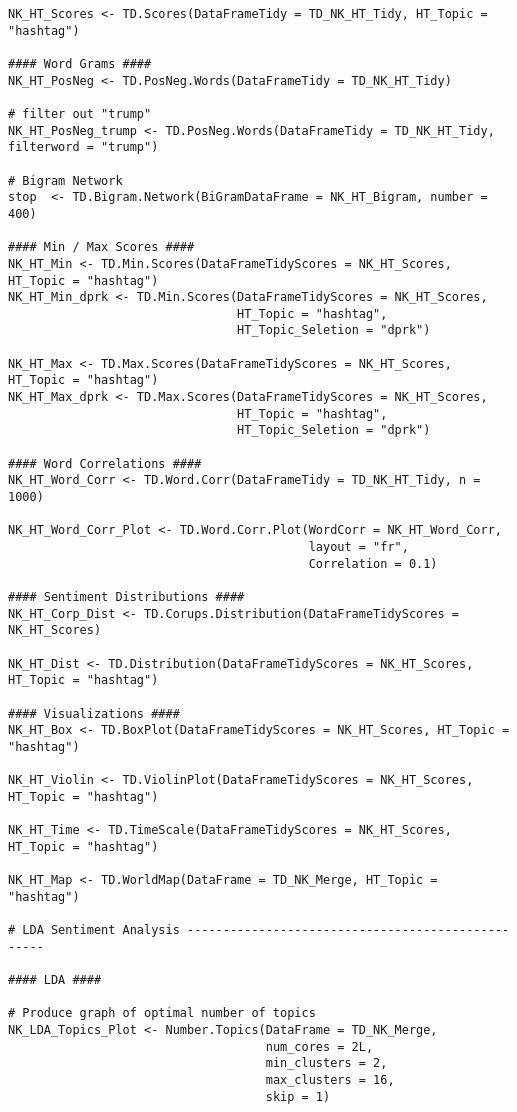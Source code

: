 \begin{lstlisting}
NK_HT_Scores <- TD.Scores(DataFrameTidy = TD_NK_HT_Tidy, HT_Topic = "hashtag")

#### Word Grams #### 
NK_HT_PosNeg <- TD.PosNeg.Words(DataFrameTidy = TD_NK_HT_Tidy)

# filter out "trump"
NK_HT_PosNeg_trump <- TD.PosNeg.Words(DataFrameTidy = TD_NK_HT_Tidy, filterword = "trump")

# Bigram Network
stop  <- TD.Bigram.Network(BiGramDataFrame = NK_HT_Bigram, number = 400)

#### Min / Max Scores #### 
NK_HT_Min <- TD.Min.Scores(DataFrameTidyScores = NK_HT_Scores, HT_Topic = "hashtag")
NK_HT_Min_dprk <- TD.Min.Scores(DataFrameTidyScores = NK_HT_Scores, 
                                HT_Topic = "hashtag", 
                                HT_Topic_Seletion = "dprk")

NK_HT_Max <- TD.Max.Scores(DataFrameTidyScores = NK_HT_Scores, HT_Topic = "hashtag")
NK_HT_Max_dprk <- TD.Max.Scores(DataFrameTidyScores = NK_HT_Scores, 
                                HT_Topic = "hashtag", 
                                HT_Topic_Seletion = "dprk")

#### Word Correlations ####
NK_HT_Word_Corr <- TD.Word.Corr(DataFrameTidy = TD_NK_HT_Tidy, n = 1000)

NK_HT_Word_Corr_Plot <- TD.Word.Corr.Plot(WordCorr = NK_HT_Word_Corr, 
                                          layout = "fr",
                                          Correlation = 0.1)

#### Sentiment Distributions ####
NK_HT_Corp_Dist <- TD.Corups.Distribution(DataFrameTidyScores = NK_HT_Scores)

NK_HT_Dist <- TD.Distribution(DataFrameTidyScores = NK_HT_Scores, HT_Topic = "hashtag")

#### Visualizations ####
NK_HT_Box <- TD.BoxPlot(DataFrameTidyScores = NK_HT_Scores, HT_Topic = "hashtag")

NK_HT_Violin <- TD.ViolinPlot(DataFrameTidyScores = NK_HT_Scores, HT_Topic = "hashtag")

NK_HT_Time <- TD.TimeScale(DataFrameTidyScores = NK_HT_Scores, HT_Topic = "hashtag")

NK_HT_Map <- TD.WorldMap(DataFrame = TD_NK_Merge, HT_Topic = "hashtag")

# LDA Sentiment Analysis --------------------------------------------------

#### LDA ####

# Produce graph of optimal number of topics
NK_LDA_Topics_Plot <- Number.Topics(DataFrame = TD_NK_Merge, 
                                    num_cores = 2L, 
                                    min_clusters = 2, 
                                    max_clusters = 16, 
                                    skip = 1)


\end{lstlisting}
